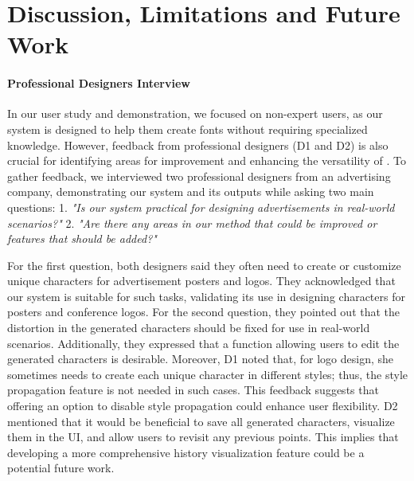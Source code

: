\section{Discussion, Limitations and Future Work}
\label{sec:limitations}

\paragraph{Professional Designers Interview}
In our user study and demonstration, we focused on non-expert users, as our system is designed to help them create fonts without requiring specialized knowledge.
However, feedback from professional designers (D1 and D2) is also crucial for identifying areas for improvement and enhancing the versatility of \systemName.
To gather feedback, we interviewed two professional designers from an advertising company, demonstrating our system and its outputs while asking two main questions:
1. \textit{"Is our system practical for designing advertisements in real-world scenarios?"}
2. \textit{"Are there any areas in our method that could be improved or features that should be added?"}

For the first question, both designers said they often need to create or customize unique characters for advertisement posters and logos.
They acknowledged that our system is suitable for such tasks, validating its use in designing characters for posters and conference logos.
For the second question, they pointed out that the distortion in the generated characters should be fixed for use in real-world scenarios.
Additionally, they expressed that a function allowing users to edit the generated characters is desirable.
Moreover, D1 noted that, for logo design, she sometimes needs to create each unique character in different styles; thus, the style propagation feature is not needed in such cases.
This feedback suggests that offering an option to disable style propagation could enhance user flexibility.
D2 mentioned that it would be beneficial to save all generated characters, visualize them in the UI, and allow users to revisit any previous points.
This implies that developing a more comprehensive history visualization feature could be a potential future work.

